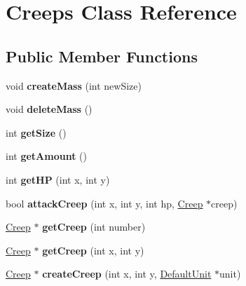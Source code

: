 \hypertarget{class_creeps}{}\section{Creeps Class Reference}
\label{class_creeps}
\subsection*{Public Member Functions}
\begin{DoxyCompactItemize}
\item 
\hypertarget{class_creeps_a061dddce61b4d73e3482f128242f23e8}{}void {\bfseries create\+Mass} (int new\+Size)\label{class_creeps_a061dddce61b4d73e3482f128242f23e8}

\item 
\hypertarget{class_creeps_ab09b41bd7fd04ba2bb321610b5f98f13}{}void {\bfseries delete\+Mass} ()\label{class_creeps_ab09b41bd7fd04ba2bb321610b5f98f13}

\item 
\hypertarget{class_creeps_a879bfae7553a1a339dd5003426b42003}{}int {\bfseries get\+Size} ()\label{class_creeps_a879bfae7553a1a339dd5003426b42003}

\item 
\hypertarget{class_creeps_ae77d201fd6f9a71065efea48e946ddfa}{}int {\bfseries get\+Amount} ()\label{class_creeps_ae77d201fd6f9a71065efea48e946ddfa}

\item 
\hypertarget{class_creeps_ab137d8851f079b980ecc294a6e4ac2a0}{}int {\bfseries get\+H\+P} (int x, int y)\label{class_creeps_ab137d8851f079b980ecc294a6e4ac2a0}

\item 
\hypertarget{class_creeps_a4d6dec30d1ac708a7b4ddff9fc8a2e6e}{}bool {\bfseries attack\+Creep} (int x, int y, int hp, \hyperlink{class_creep}{Creep} $\ast$creep)\label{class_creeps_a4d6dec30d1ac708a7b4ddff9fc8a2e6e}

\item 
\hypertarget{class_creeps_a0c58e5bbf62fb56c02d27d01ac513af0}{}\hyperlink{class_creep}{Creep} $\ast$ {\bfseries get\+Creep} (int number)\label{class_creeps_a0c58e5bbf62fb56c02d27d01ac513af0}

\item 
\hypertarget{class_creeps_a672edf45dd50dfb400aa15e2f4089eaf}{}\hyperlink{class_creep}{Creep} $\ast$ {\bfseries get\+Creep} (int x, int y)\label{class_creeps_a672edf45dd50dfb400aa15e2f4089eaf}

\item 
\hypertarget{class_creeps_aee6450aac5d2267f119a5cf4930d50a6}{}\hyperlink{class_creep}{Creep} $\ast$ {\bfseries create\+Creep} (int x, int y, \hyperlink{class_default_unit}{Default\+Unit} $\ast$unit)\label{class_creeps_aee6450aac5d2267f119a5cf4930d50a6}


\end{DoxyCompactItemize}

